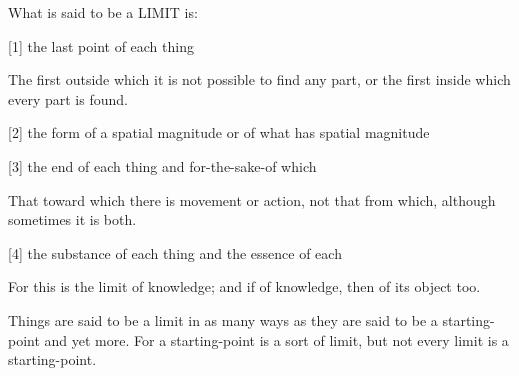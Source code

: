 What is said to be a LIMIT is:

[1]     the last point of each thing
    
        The first outside which it is not possible to find any part,
        or the first inside which every part is found.

[2]     the form of a spatial magnitude or of what has spatial magnitude

[3]     the end of each thing and for-the-sake-of which

        That toward which there is movement or action,
        not that from which, although sometimes it is both.

[4]     the substance of each thing and the essence of each
            
        For this is the limit of knowledge; and if of knowledge,
        then of its object too.

Things are said to be a limit in as many ways as they are said to be
a starting-point and yet more. For a starting-point is a sort of limit,
but not every limit is a starting-point.
